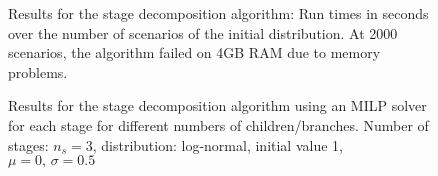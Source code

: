 \begin{figure}
  \centering
  \caption{Results for the stage decomposition algorithm: Run times in seconds over the number of scenarios of the initial distribution. At 2000 scenarios, the algorithm failed on 4GB RAM due to memory problems.}
  \label{fig:naive-milp-results-timing}
\end{figure}
\begin{figure}
  \centering
  \caption{Results for the stage decomposition algorithm using an MILP solver for each stage for different numbers of children/branches. Number of stages: $n_s=3$, distribution: log-normal, initial value 1, $\mu=0,\,\sigma=0.5$}
  \label{fig:naive-milp-results-errors}
\end{figure}
